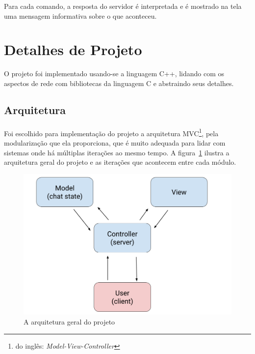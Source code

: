 \documentclass[11pt]{article}
\newcommand{\fromeng}[1]{\footnote{do inglês: \textit{#1}}}
\begin{document}
Para cada comando, a resposta do servidor é interpretada e é mostrado na tela
uma mensagem informativa sobre o que aconteceu.

\section{Detalhes de Projeto}
\paragraph{}
O projeto foi implementado usando-se a linguagem C++, lidando com os aspectos
de rede com bibliotecas da linguagem C e abstraindo seus detalhes.

\subsection{Arquitetura}
\paragraph{}
Foi escolhido para implementação do projeto a arquitetura 
MVC\fromeng{Model-View-Controller}, pela modularização que ela proporciona, 
que é muito adequada para lidar com sistemas onde há múltiplas iterações
ao mesmo tempo. 
A figura~\ref{fig:arq} ilustra a arquitetura geral do projeto e as iterações
que acontecem entre cada módulo.
\begin{figure}[H]
	\centering
	\includegraphics[width=0.8\linewidth]{imgs/mvc.png}
	\caption[7pt]{A arquitetura geral do projeto}
	\label{fig:arq}
\end{figure}
\end{document}
